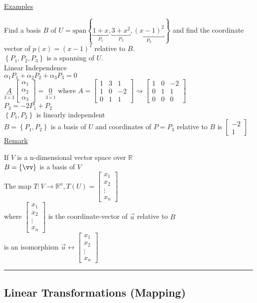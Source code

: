 \documentclass[12pt]{article}
\renewcommand{\v}[1]{\overrightarrow{#1}}
\newcommand\m[1]{\begin{bmatrix}#1\end{bmatrix}}
\newcommand{\real}[0]{\mathbb{R}}
\newenvironment{block}[1][Label]{\underline{#1}\par}{}
\newcommand{\uu}[1]{\underbracket{#1}}
\newenvironment{examples}{\shownto{-,compact}\underline{Examples}\enumerate}{\endenumerate\divider\endshownto}
\newcommand{\bb}[1]{\left\{#1\right\}}
\newcommand{\divider}[0]{\textcolor{lightgray}{\rule{\textwidth}{0.1pt}}}
\newcommand{\sspan}[1]{\text{span}\bb{#1}}
\begin{document}
\begin{examples}
	\item Find a basis $B$ of $U = \sspan{\uu{1 + x}_{P_1}, \uu{3 + x^2}_{P_2}, \uu{(x - 1)^2}_{P_3}}$ and find the coordinate vector of $p(x) = (x - 1)^2$ relative to $B$. \\
	$\bb{P_1, P_2, P_3}$ is a spanning of $U$. \\
	Linear Independence \\
	$\alpha_1 P_1 + \alpha_2 P_2 + \alpha_3 P_3 = 0$ \\
	$\uu{A}_{3 \times 3} \m{\alpha_1 \\ \alpha_2 \\ \alpha_3} = \uu{0}_{3 \times 1}$ where $A = \m{1 & 3 & 1 \\ 1 & 0 & -2 \\ 0 & 1 & 1} \rightsquigarrow \m{1 & 0 & -2 \\ 0 & 1 & 1 \\ 0 & 0 & 0}$ \\
	$P_3 = -2 P_1 + P_2$ \\
	$\bb{P_1, P_2}$ is linearly independent \\
	$B = \bb{P_1, P_2}$ is a basis of $U$ and coordinates of $P = P_3$ relative to $B$ is $\m{-2 \\ 1}$ \\
	\begin{block}[Remark]
		If $V$ is a n-dimensional vector space over $\real$ \\
		$B = \bb{\vv}$ is a basis of $V$ \\
		The map $T: V \rightarrow \real^n, T(U) = \m{x_1 \\ x_2 \\ \vdots \\ x_n}$ \\
		where $\m{x_1 \\ x_2 \\ \vdots \\ x_n}$ is the coordinate-vector of $\v{u}$ relative to $B$ \\
		is an isomorphism $\v{u} \leftrightarrow \m{x_1 \\ x_2 \\ \vdots \\ x_n}$
	\end{block}
\end{examples}

\subsection{Linear Transformations (Mapping)}
\end{document}

